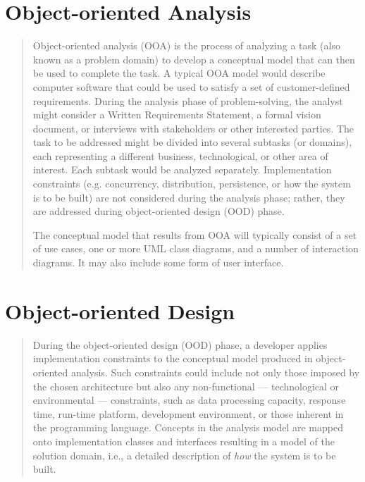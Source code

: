 \documentclass [11pt]{book}
\begin{document}
\section{Object-oriented Analysis}

\label{sec:object-orientedanalysis}



\begin{quote}


Object-oriented analysis (OOA) is the process of analyzing
       a task (also known as a problem domain) to develop a conceptual
       model that can then be used to complete the task. A typical OOA
       model would describe computer software that could be used to
       satisfy a set of customer-defined requirements. During the
       analysis phase of problem-solving, the analyst might consider a
       Written Requirements Statement, a formal vision document, or
       interviews with stakeholders or other interested parties. The
       task to be addressed might be divided into several subtasks (or
       domains), each representing a different business,
       technological, or other area of interest. Each subtask would be
       analyzed separately. Implementation
       constraints (e.g. concurrency, distribution, persistence, or
       how the system is to be built) are not considered during the
       analysis phase; rather, they are addressed during
       object-oriented design (OOD) phase.



The conceptual model that results from OOA will typically consist of a
set of use cases, one or more UML class diagrams, and a number of
interaction diagrams. It may also include some form of user interface.



\end{quote}


\section{Object-oriented Design}

\label{sec:object-orienteddesign}



\begin{quote}
During the object-oriented design (OOD) phase, a developer
applies implementation constraints to the conceptual model produced in
object-oriented analysis. Such constraints could include not only
those imposed by the chosen architecture but also any non-functional
--- technological or environmental --- constraints, such as data
processing capacity, response time, run-time platform, development
environment, or those inherent in the programming language. Concepts
in the analysis model are mapped onto implementation classes and
interfaces resulting in a model of the solution domain, i.e., a
detailed description of \emph{how} the system is to be built.

\end{quote}
\end{document}
